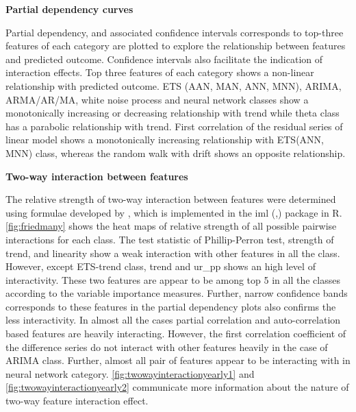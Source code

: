 \documentclass[11pt,a4paper,]{article}
\theoremstyle{definition}
\theoremstyle{definition}
\theoremstyle{definition}
\theoremstyle{remark}
\begin{document}
\textbf{Partial dependency curves}

Partial dependency, and associated confidence intervals corresponds to
top-three features of each category are plotted to explore the
relationship between features and predicted outcome. Confidence
intervals also facilitate the indication of interaction effects. Top
three features of each category shows a non-linear relationship with
predicted outcome. ETS (AAN, MAN, ANN, MNN), ARIMA, ARMA/AR/MA, white
noise process and neural network classes show a monotonically increasing
or decreasing relationship with trend while theta class has a parabolic
relationship with trend. First correlation of the residual series of
linear model shows a monotonically increasing relationship with ETS(ANN,
MNN) class, whereas the random walk with drift shows an opposite
relationship.

\textbf{Two-way interaction between features}

The relative strength of two-way interaction between features were
determined using formulae developed by
\textcite{friedman2008predictive}, which is implemented in the iml
(\textcite{molnar2018iml},) package in R. \autoref{fig:friedmany} shows
the heat maps of relative strength of all possible pairwise interactions
for each class. The test statistic of Phillip-Perron test, strength of
trend, and linearity show a weak interaction with other features in all
the class. However, except ETS-trend class, trend and ur\_pp shows an
high level of interactivity. These two features are appear to be among
top 5 in all the classes according to the variable importance measures.
Further, narrow confidence bands corresponds to these features in the
partial dependency plots also confirms the less interactivity. In almost
all the cases partial correlation and auto-correlation based features
are heavily interacting. However, the first correlation coefficient of
the difference series do not interact with other features heavily in the
case of ARIMA class. Further, almost all pair of features appear to be
interacting with in neural network category.
\autoref{fig:twowayinteractionyearly1} and
\autoref{fig:twowayinteractionyearly2} communicate more information
about the nature of two-way feature interaction effect.

\newpage
\end{document}

